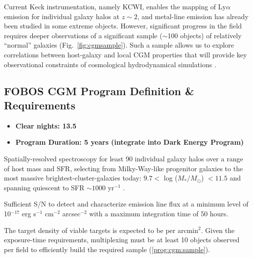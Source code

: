 \documentclass[11pt,a4paper,twoside,onecolumn,openany,final,oldfontcommands]{memoir}
\begin{document}
Current Keck instrumentation, namely KCWI, enables the mapping of Ly$\alpha$ emission for individual galaxy halos at $z\sim2$, and metal-line emission has already been studied in some extreme objects. However, significant progress in the field requires deeper observations of a significant sample ($\sim$100 objects) of relatively ``normal'' galaxies (Fig.~\ref{fig:cgmsample}).  Such a sample allows us to explore correlations between host-galaxy and local CGM properties that will provide key observational constraints of cosmological hydrodynamical simulations .


\subsection{FOBOS CGM Program Definition \& Requirements}

\medskip
\begin{itemize}[leftmargin=0.3in, itemsep=0pt]
	\item[] \textbf{Clear nights: 13.5}
	\item[] \textbf{Program Duration: 5 years (integrate into Dark Energy Program)}
\end{itemize}



\begin{programrequirement}
\reqitem Spatially-resolved spectroscopy for least 90 individual galaxy halos over a range of host mass and SFR, selecting from Milky-Way-like progenitor galaxies to the most massive brightest-cluster-galaxies today: $9.7 <$ log ($M_*/M_\odot$) $< 11.5$ and spanning quiescent to SFR $\sim 1000$ yr$^{-1}$ . \label{prog:cgm:sample}

\reqitem Sufficient S/N to detect and characterize emission line flux at a minimum level of  10$^{-17}$ erg s$^{-1}$ cm$^{-2}$ arcsec$^{-2}$ with a maximum integration time of 50 hours.

\reqitem The target density of viable targets is expected to be  per arcmin$^2$.  Given the exposure-time requirements, multiplexing must be at least 10 objects observed per field to efficiently build the required sample (\ref{prog:cgm:sample}).
\end{programrequirement}
\end{document}
